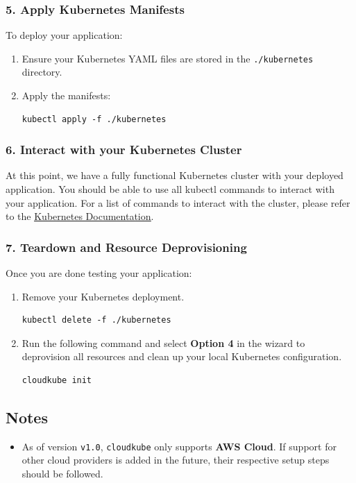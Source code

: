 \subsubsection*{5. Apply Kubernetes Manifests}
To deploy your application:
\vspace{-1em}
\begin{enumerate}[label=\alph*.]
    \item Ensure your Kubernetes YAML files are stored in the \texttt{./kubernetes} directory.
    \item Apply the manifests:
          \begin{lstlisting}[xleftmargin=40pt]
kubectl apply -f ./kubernetes
          \end{lstlisting}
\end{enumerate}

\subsubsection*{6. Interact with your Kubernetes Cluster}

At this point, we have a fully functional Kubernetes cluster with your deployed application. You should be able to use all kubectl commands to interact with your application. For a list of commands to interact with the cluster, please refer to the 
\href{https://kubernetes.io/docs/home/}{\color{blue}\underline{Kubernetes Documentation}}.

\subsubsection*{7. Teardown and Resource Deprovisioning}
Once you are done testing your application:
\vspace{-1em}
\begin{enumerate}[label=\alph*.]
    \item Remove your Kubernetes deployment.
          \begin{lstlisting}[xleftmargin=40pt]
kubectl delete -f ./kubernetes
          \end{lstlisting}
    \item Run the following command and select \textbf{Option 4} in the wizard to deprovision all resources and clean up your local Kubernetes configuration.
            \begin{lstlisting}[xleftmargin=40pt]
cloudkube init
            \end{lstlisting}
\end{enumerate}

\subsection*{Notes}
\begin{itemize}
    \item As of version \texttt{v1.0}, \texttt{cloudkube} only supports \textbf{AWS Cloud}. If support for other cloud providers is added in the future, their respective setup steps should be followed.
\end{itemize}

